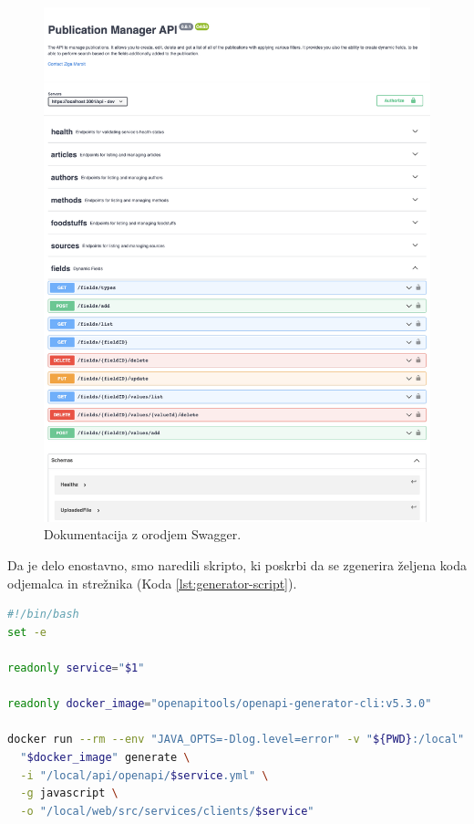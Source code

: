 \documentclass[a4paper, 12pt]{book}
\begin{document}
\newpage
\begin{figure}[h]
\begin{center}
\includegraphics[width=1\textwidth]{slike/documentation.png}
\end{center}
\caption{ Dokumentacija z orodjem Swagger. }
\label{swagger-docs}
\end{figure}
\clearpage


Da je delo enostavno, smo naredili skripto, ki poskrbi da se zgenerira željena koda odjemalca in strežnika (Koda \ref{lst:generator-script}).
\begin{lstlisting}[language=bash, style=mystyle, caption={Skripta, ki poskrbi za generiranje kode za posamezno storitev},label=lst:generator-script]
#!/bin/bash
set -e

readonly service="$1"

readonly docker_image="openapitools/openapi-generator-cli:v5.3.0"

docker run --rm --env "JAVA_OPTS=-Dlog.level=error" -v "${PWD}:/local" \
  "$docker_image" generate \
  -i "/local/api/openapi/$service.yml" \
  -g javascript \
  -o "/local/web/src/services/clients/$service"
\end{lstlisting}
    
\end{document}
